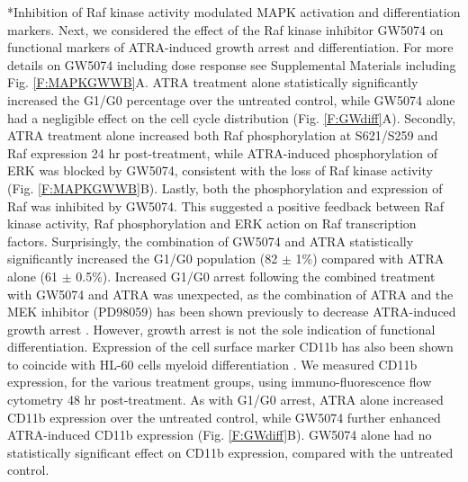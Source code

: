 \documentclass[12pt]{article}
\makeatletter
\renewcommand\subsection{\@startsection
	{subsection}{2}{0mm}
	{-0.05in}
	{-0.5\baselineskip}
	{\normalfont\normalsize\bfseries}}
\makeatother
\begin{document}
\subsection*{Inhibition of Raf kinase activity modulated MAPK activation and differentiation markers.}
Next, we considered the effect of the Raf kinase inhibitor GW5074 on functional markers of ATRA-induced growth arrest and differentiation.
For more details on GW5074 including dose response see Supplemental Materials including Fig. \ref{F:MAPKGWWB}A.
ATRA treatment alone statistically significantly increased the G1/G0 percentage over the untreated control, 
while GW5074 alone had a negligible effect on the cell cycle distribution (Fig. \ref{F:GWdiff}A).
Secondly, ATRA treatment alone increased both Raf phosphorylation at S621/S259 and Raf expression 24 hr post-treatment,
while ATRA-induced phosphorylation of ERK was blocked by GW5074, consistent with the loss of Raf kinase activity (Fig. \ref{F:MAPKGWWB}B).
Lastly, both the phosphorylation and expression of Raf was inhibited by GW5074.
This suggested a positive feedback between Raf kinase activity, Raf phosphorylation and ERK action on Raf transcription factors.
Surprisingly, the combination of GW5074 and ATRA statistically significantly increased the G1/G0 population (82 $\pm$ 1\%)
compared with ATRA alone (61 $\pm$ 0.5\%).
Increased G1/G0 arrest following the combined treatment with GW5074 and ATRA was unexpected, 
as the combination of ATRA and the MEK inhibitor (PD98059) has been shown previously to decrease ATRA-induced growth arrest \cite{Yen1998}.
However, growth arrest is not the sole indication of functional differentiation.
Expression of the cell surface marker CD11b has also been shown to coincide with HL-60 cells myeloid differentiation \cite{Hickstein1989}.  
We measured CD11b expression, for the various treatment groups, using immuno-fluorescence flow cytometry 48 hr post-treatment.
As with G1/G0 arrest, ATRA alone increased CD11b expression over the untreated control, 
while GW5074 further enhanced ATRA-induced CD11b expression (Fig. \ref{F:GWdiff}B).
GW5074 alone had no statistically significant effect on CD11b expression, 
compared with the untreated control.
\end{document}
